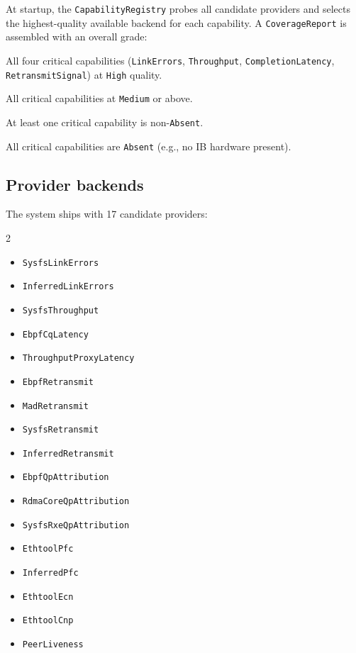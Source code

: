 \documentclass[11pt]{article}
\begin{document}
At startup, the \texttt{CapabilityRegistry} probes all candidate providers
and selects the highest-quality available backend for each capability.
A \texttt{CoverageReport} is assembled with an overall grade:

\begin{description}[nosep]
  \item[Grade A] All four critical capabilities (\texttt{LinkErrors},
    \texttt{Throughput}, \texttt{CompletionLatency}, \texttt{RetransmitSignal})
    at \texttt{High} quality.
  \item[Grade B] All critical capabilities at \texttt{Medium} or above.
  \item[Grade C] At least one critical capability is non-\texttt{Absent}.
  \item[Grade F] All critical capabilities are \texttt{Absent} (e.g., no IB
    hardware present).
\end{description}

\subsection{Provider backends}

The system ships with 17 candidate providers:

\begin{multicols}{2}
\begin{itemize}[nosep]
  \item \texttt{SysfsLinkErrors}
  \item \texttt{InferredLinkErrors}
  \item \texttt{SysfsThroughput}
  \item \texttt{EbpfCqLatency}
  \item \texttt{ThroughputProxyLatency}
  \item \texttt{EbpfRetransmit}
  \item \texttt{MadRetransmit}
  \item \texttt{SysfsRetransmit}
  \item \texttt{InferredRetransmit}
  \item \texttt{EbpfQpAttribution}
  \item \texttt{RdmaCoreQpAttribution}
  \item \texttt{SysfsRxeQpAttribution}
  \item \texttt{EthtoolPfc}
  \item \texttt{InferredPfc}
  \item \texttt{EthtoolEcn}
  \item \texttt{EthtoolCnp}
  \item \texttt{PeerLiveness}
\end{itemize}
\end{multicols}
\end{document}
